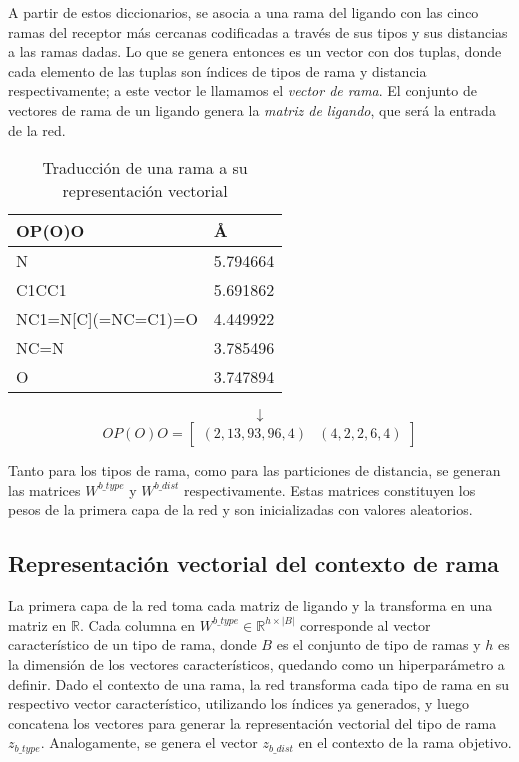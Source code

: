 A partir de estos diccionarios, se asocia a una rama del ligando con
las cinco ramas del receptor más cercanas codificadas a través de sus
tipos y sus distancias a las ramas dadas. Lo que se genera entonces es
un vector con dos tuplas, donde cada elemento de las tuplas son
índices de tipos de rama y distancia respectivamente; a este vector le
llamamos el \textit{vector de rama}. El conjunto de vectores de rama
de un ligando genera la \textit{matriz de ligando}, que será la
entrada de la red.

\begin{table}[H]
  \begin{center}
  \begin{tabular}{l|l}
    OP(O)O & \AA \\ \hline N & 5.794664 \\ C1CC1 & 5.691862
    \\ NC1=N{[}C{]}(=NC=C1)=O & 4.449922 \\ NC=N & 3.785496 \\ O &
    3.747894
  \end{tabular}
  \end{center}
  \begin{equation*}
  \downarrow
  \end{equation*}
  \begin{equation*}
    OP(O)O=\begin{bmatrix}
    (2, 13, 93, 96, 4) & (4, 2, 2, 6, 4)
    \end{bmatrix}
  \end{equation*}
  \caption{Traducción de una rama a su representación vectorial}
\end{table}

Tanto para los tipos de rama, como para las particiones de distancia, se
generan las matrices $W^{b\_type}$ y $W^{b\_dist}$ respectivamente. Estas
matrices constituyen los pesos de la primera capa de la red y son
inicializadas con valores aleatorios.

\subsection{Representación vectorial del contexto de rama}

La primera capa de la red toma cada matriz de ligando y la transforma
en una matriz en $\mathbb{R}$. Cada columna en $W^{b\_type} \in
\mathbb{R}^{h\times |B|}$ corresponde al vector característico de un
tipo de rama, donde $B$ es el conjunto de tipo de ramas y $h$ es la
dimensión de los vectores característicos, quedando como un
hiperparámetro a definir.  Dado el contexto de una rama, la red
transforma cada tipo de rama en su respectivo vector característico,
utilizando los índices ya generados, y luego concatena los vectores
para generar la representación vectorial del tipo de rama
$z_{b\_type}$. Analogamente, se genera el vector $z_{b\_dist}$ en el
contexto de la rama objetivo.

